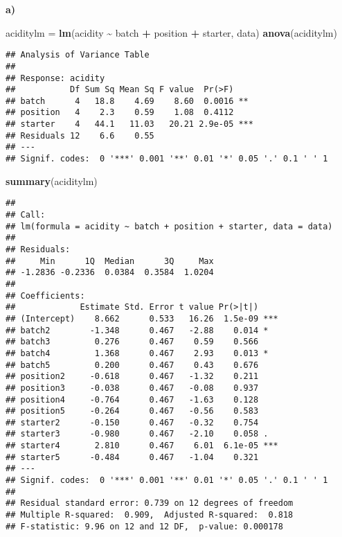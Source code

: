 \documentclass[
]{article}
\newenvironment{Shaded}{\begin{snugshade}}{\end{snugshade}}
\newcommand{\FunctionTok}[1]{\textcolor[rgb]{0.13,0.29,0.53}{\textbf{#1}}}
\newcommand{\NormalTok}[1]{#1}
\newcommand{\OtherTok}[1]{\textcolor[rgb]{0.56,0.35,0.01}{#1}}
\newcommand{\SpecialCharTok}[1]{\textcolor[rgb]{0.81,0.36,0.00}{\textbf{#1}}}
\begin{document}
\textbf{a)}

\begin{Shaded}
\begin{Highlighting}[]
\NormalTok{aciditylm }\OtherTok{=} \FunctionTok{lm}\NormalTok{(acidity }\SpecialCharTok{\textasciitilde{}}\NormalTok{ batch }\SpecialCharTok{+}\NormalTok{ position }\SpecialCharTok{+}\NormalTok{ starter, data)}
\FunctionTok{anova}\NormalTok{(aciditylm)}
\end{Highlighting}
\end{Shaded}

\begin{verbatim}
## Analysis of Variance Table
## 
## Response: acidity
##           Df Sum Sq Mean Sq F value  Pr(>F)    
## batch      4   18.8    4.69    8.60  0.0016 ** 
## position   4    2.3    0.59    1.08  0.4112    
## starter    4   44.1   11.03   20.21 2.9e-05 ***
## Residuals 12    6.6    0.55                    
## ---
## Signif. codes:  0 '***' 0.001 '**' 0.01 '*' 0.05 '.' 0.1 ' ' 1
\end{verbatim}

\begin{Shaded}
\begin{Highlighting}[]
\FunctionTok{summary}\NormalTok{(aciditylm)}
\end{Highlighting}
\end{Shaded}

\begin{verbatim}
## 
## Call:
## lm(formula = acidity ~ batch + position + starter, data = data)
## 
## Residuals:
##     Min      1Q  Median      3Q     Max 
## -1.2836 -0.2336  0.0384  0.3584  1.0204 
## 
## Coefficients:
##             Estimate Std. Error t value Pr(>|t|)    
## (Intercept)    8.662      0.533   16.26  1.5e-09 ***
## batch2        -1.348      0.467   -2.88    0.014 *  
## batch3         0.276      0.467    0.59    0.566    
## batch4         1.368      0.467    2.93    0.013 *  
## batch5         0.200      0.467    0.43    0.676    
## position2     -0.618      0.467   -1.32    0.211    
## position3     -0.038      0.467   -0.08    0.937    
## position4     -0.764      0.467   -1.63    0.128    
## position5     -0.264      0.467   -0.56    0.583    
## starter2      -0.150      0.467   -0.32    0.754    
## starter3      -0.980      0.467   -2.10    0.058 .  
## starter4       2.810      0.467    6.01  6.1e-05 ***
## starter5      -0.484      0.467   -1.04    0.321    
## ---
## Signif. codes:  0 '***' 0.001 '**' 0.01 '*' 0.05 '.' 0.1 ' ' 1
## 
## Residual standard error: 0.739 on 12 degrees of freedom
## Multiple R-squared:  0.909,  Adjusted R-squared:  0.818 
## F-statistic: 9.96 on 12 and 12 DF,  p-value: 0.000178
\end{verbatim}
\end{document}
